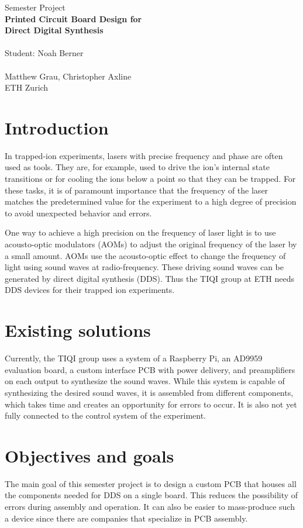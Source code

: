\documentclass[10pt]{article}
\begin{document}
\begingroup  
  \centering
{\Large Semester Project}\\
  \LARGE \textbf{
Printed Circuit Board Design for\\
Direct Digital Synthesis
}\\~\\
  \Large Student: Noah Berner~\\~\\
 
  \large Matthew Grau, Christopher Axline\\
ETH Zurich\\
{
\centering
}
\endgroup

\section*{Introduction}
In trapped-ion experiments, lasers with precise frequency and phase are often used as tools. They are, for example, used to drive the ion's internal state transitions or for cooling the ions below a point so that they can be trapped. For these tasks, it is of paramount importance that the frequency of the laser matches the predetermined value for the experiment to a high degree of precision to avoid unexpected behavior and errors.

One way to achieve a high precision on the frequency of laser light is to use acousto-optic modulators (AOMs) to adjust the original frequency of the laser by a small amount. AOMs use the acousto-optic effect to change the frequency of light using sound waves at radio-frequency. These driving sound waves can be generated by direct digital synthesis (DDS). Thus the TIQI group at ETH needs DDS devices for their trapped ion experiments.

\section*{Existing solutions}
Currently, the TIQI group uses a system of a Raspberry Pi, an AD9959 evaluation board, a custom interface PCB with power delivery, and preamplifiers on each output to synthesize the sound waves. While this system is capable of synthesizing the desired sound waves, it is assembled from different components, which takes time and creates an opportunity for errors to occur. It is also not yet fully connected to the control system of the experiment.

\section*{Objectives and goals} 
The main goal of this semester project is to design a custom PCB that houses all the components needed for DDS on a single board. This reduces the possibility of errors during assembly and operation. It can also be easier to mass-produce such a device since there are companies that specialize in PCB assembly.
\end{document}
